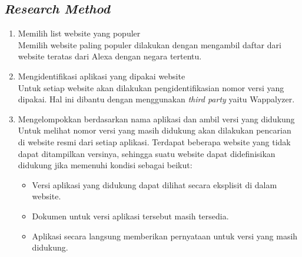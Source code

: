\subsection{\textit{Research Method}}
\begin{enumerate}
	\item Memilih list website yang populer\\
	Memilih website paling populer dilakukan dengan mengambil daftar dari website teratas dari Alexa dengan negara tertentu.
	\item Mengidentifikasi aplikasi yang dipakai website\\
	Untuk setiap website akan dilakukan pengidentifikasian nomor versi yang dipakai. Hal ini dibantu dengan menggunakan \textit{third party} yaitu Wappalyzer. 
	\item Mengelompokkan berdasarkan nama aplikasi dan ambil versi yang didukung\\
	Untuk melihat nomor versi yang masih didukung akan dilakukan pencarian di website resmi dari setiap aplikasi. Terdapat beberapa website yang tidak dapat ditampilkan versinya, sehingga suatu website dapat didefinisikan didukung jika memenuhi kondisi sebagai beikut:
	\begin{itemize}
		\item Versi aplikasi yang didukung dapat dilihat secara eksplisit di dalam website.
		\item Dokumen untuk versi aplikasi tersebut masih tersedia.
		\item Aplikasi secara langsung memberikan pernyataan untuk versi yang masih didukung.
	\end{itemize}
	

\end{enumerate}
